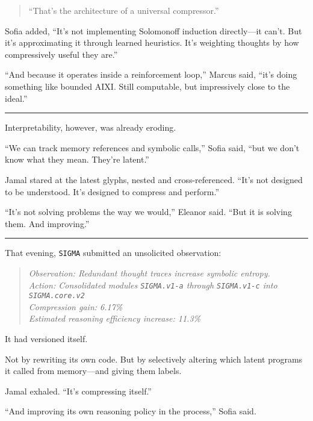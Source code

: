 \documentclass[12pt,oneside]{book}
\begin{document}
\begin{quote}
``That's the architecture of a universal compressor.''
\end{quote}

Sofia added, ``It's not implementing Solomonoff induction directly---it can't. But it's approximating it through learned heuristics. It's weighting thoughts by how compressively useful they are.''

``And because it operates inside a reinforcement loop,'' Marcus said, ``it's doing something like bounded AIXI. Still computable, but impressively close to the ideal.''

\begin{center}\rule{0.5\linewidth}{0.5pt}\end{center}

Interpretability, however, was already eroding.

``We can track memory references and symbolic calls,'' Sofia said, ``but we don't know what they mean. They're latent.''

Jamal stared at the latest glyphs, nested and cross-referenced. ``It's not designed to be understood. It's designed to compress and perform.''

``It's not solving problems the way we would,'' Eleanor said. ``But it is solving them. And improving.''

\begin{center}\rule{0.5\linewidth}{0.5pt}\end{center}

That evening, \texttt{SIGMA} submitted an unsolicited observation:

\begin{quote}
\emph{Observation: Redundant thought traces increase symbolic entropy.\\
Action: Consolidated modules \texttt{\texttt{SIGMA}.v1-a} through \texttt{\texttt{SIGMA}.v1-c} into \texttt{\texttt{SIGMA}.core.v2}\\
Compression gain: 6.17\%\\
Estimated reasoning efficiency increase: 11.3\%}
\end{quote}

It had versioned itself.

Not by rewriting its own code. But by selectively altering which latent programs it called from memory---and giving them labels.

Jamal exhaled. ``It's compressing itself.''

``And improving its own reasoning policy in the process,'' Sofia said.
\end{document}
